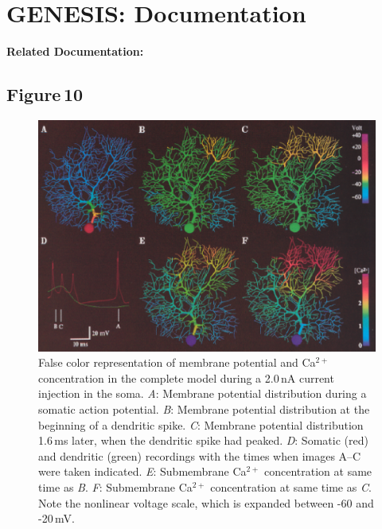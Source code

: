 \documentclass[12pt]{article}
\begin{document}
\section*{GENESIS: Documentation}

{\bf Related Documentation:}

\subsection*{Figure\,10}

\begin{figure}[h]
\centering
   \includegraphics[scale=0.75]{figures/Fig.1.10.eps}
   \caption{False color representation of membrane potential and Ca$^{2+}$ concentration in the complete model during a 2.0\,nA current injection in the soma. {\it A}: Membrane potential distribution during a somatic action potential. {\it B}: Membrane potential distribution at the beginning of a dendritic spike. {\it C}: Membrane potential distribution 1.6\,ms later, when the dendritic spike had peaked. {\it D}: Somatic (red) and dendritic (green) recordings with the times when images A--C were taken indicated. {\it E}: Submembrane Ca$^{2+}$ concentration at same time as {\it B}. {\it F}: Submembrane Ca$^{2+}$ concentration at same time as {\it C}. Note the nonlinear voltage scale, which is expanded between -60 and -20\,mV.}
   \label{fig:DS1.10}
\end{figure}



\end{document}
